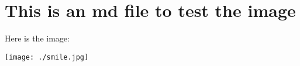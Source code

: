 \documentclass{article}
\begin{document}
\section*{This is an md file to test the image}
Here is the image:


\texttt{[image: ./smile.jpg]}
\end{document}
